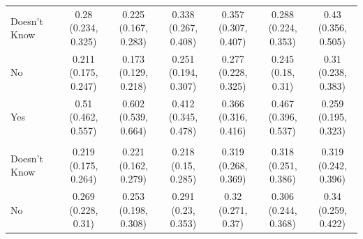 \documentclass[
]{article}
\begin{document}
\begin{table}
\begin{tabular}[t]{lcccccc}
\hline
\hspace{1em}Doesn't Know & \makecell[c]{0.28\\(0.234, 0.325)} & \makecell[c]{0.225\\(0.167, 0.283)} & \makecell[c]{0.338\\(0.267, 0.408)} & \makecell[c]{0.357\\(0.307, 0.407)} & \makecell[c]{0.288\\(0.224, 0.353)} & \makecell[c]{0.43\\(0.356, 0.505)}\\
\hspace{1em}No & \makecell[c]{0.211\\(0.175, 0.247)} & \makecell[c]{0.173\\(0.129, 0.218)} & \makecell[c]{0.251\\(0.194, 0.307)} & \makecell[c]{0.277\\(0.228, 0.325)} & \makecell[c]{0.245\\(0.18, 0.31)} & \makecell[c]{0.31\\(0.238, 0.383)}\\
\hspace{1em}Yes & \makecell[c]{0.51\\(0.462, 0.557)} & \makecell[c]{0.602\\(0.539, 0.664)} & \makecell[c]{0.412\\(0.345, 0.478)} & \makecell[c]{0.366\\(0.316, 0.416)} & \makecell[c]{0.467\\(0.396, 0.537)} & \makecell[c]{0.259\\(0.195, 0.323)}\\
\addlinespace[0.3em]
\hline
\multicolumn{7}{l}{\textbf{Ink}}\\
\hline
\hspace{1em}Doesn't Know & \makecell[c]{0.219\\(0.175, 0.264)} & \makecell[c]{0.221\\(0.162, 0.279)} & \makecell[c]{0.218\\(0.15, 0.285)} & \makecell[c]{0.319\\(0.268, 0.369)} & \makecell[c]{0.318\\(0.251, 0.386)} & \makecell[c]{0.319\\(0.242, 0.396)}\\
\hspace{1em}No & \makecell[c]{0.269\\(0.228, 0.31)} & \makecell[c]{0.253\\(0.198, 0.308)} & \makecell[c]{0.291\\(0.23, 0.353)} & \makecell[c]{0.32\\(0.271, 0.37)} & \makecell[c]{0.306\\(0.244, 0.368)} & \makecell[c]{0.34\\(0.259, 0.422)}\\

\end{tabular}
\end{table}
\end{document}
